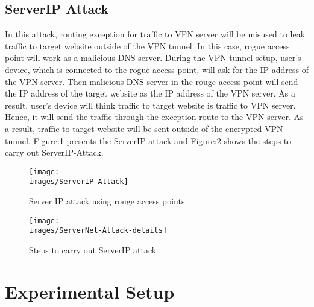 \documentclass[letterpaper,11pt]{article}
\newcommand{\images}{images}
\newcommand{\fig}{Figure:}
\begin{document}
\subsection{ServerIP Attack}
In this attack, routing exception for traffic to VPN server will be misused to leak traffic to target website outside of the VPN tunnel.
In this case, rogue access point will work as a malicious DNS server.
During the VPN tunnel setup, user's device, which is connected to the rogue access point, will ask for the IP address of the VPN server.
Then malicious DNS server in the rouge access point will send the IP address of the target website as the IP address of the VPN server.
As a result, user's device will think traffic to target website is traffic to VPN server. 
Hence, it will send the traffic through the exception route to the VPN server. 
As a result, traffic to target website will be sent outside of the encrypted VPN tunnel.
\fig \ref{fig:serverip} presents the ServerIP attack and \fig \ref{fig:serveripattackdetails} shows the steps to carry out ServerIP-Attack.

\begin{figure*}
	\begin{subfigure}{0.42\textwidth}
		\centering
		\texttt{[image: \\images/ServerIP-Attack]}
		\caption{Server IP attack using rouge access points}
		\label{fig:serverip}
	\end{subfigure}
	\begin{subfigure}{0.56\textwidth}
		\centering
		\texttt{[image: \\images/ServerNet-Attack-details]}
		\caption{Steps to carry out ServerIP attack}
		\label{fig:serveripattackdetails}
	\end{subfigure}
	\caption{Formation of ServerIP Attack}
\end{figure*}



\section{Experimental Setup}
\end{document}
